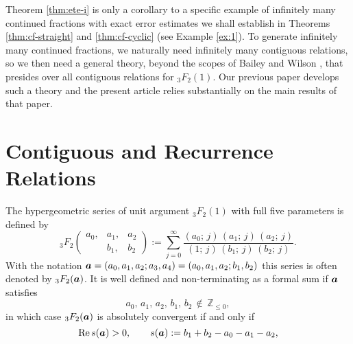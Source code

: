 \documentclass[a4paper,12pt]{article}
\theoremstyle{plain}
\def\rRe{\mathrm{Re}}
\def\Z{\mathbb{Z}}
\def\ba{\mbox{\boldmath $a$}}
\begin{document}
\par
Theorem \ref{thm:ete-i} is only a corollary to a specific example of  
infinitely many continued fractions with exact error 
estimates we shall establish in 
Theorems \ref{thm:cf-straight} and \ref{thm:cf-cyclic} (see Example \ref{ex:1}).  
To generate infinitely many continued fractions, we naturally need infinitely many 
contiguous relations, so we then need a general theory, beyond the scopes of 
Bailey \cite{Bailey2} and Wilson \cite{Wilson}, that presides over all contiguous 
relations for ${}_3F_2(1)$.  
Our previous paper \cite{EI} develops such a theory and the present article relies 
substantially on the main results of that paper.          
\section{Contiguous and Recurrence Relations} \label{sec:contig}
The hypergeometric series of unit argument ${}_3F_2(1)$ with full five 
parameters is defined by 
\begin{equation*} 
{}_3F_2\! 
\begin{pmatrix} 
a_0, & a_1, & a_2 \\ 
     & b_1, & b_2    
\end{pmatrix} := \sum_{j=0}^{\infty} 
\dfrac{(a_0; \, j) \, (a_1; \, j) \, (a_2; \, j)}{(1; \, j) \, 
(b_1; \, j) \, (b_2; \, j)}.    
\end{equation*}
With the notation $\ba = (a_0, a_1, a_2; a_3, a_4) = (a_0, a_1, a_2; b_1, b_2)$ 
this series is often denoted by ${}_3F_2(\ba)$. 
It is well defined and non-terminating as a formal sum if $\ba$ satisfies  
\begin{equation} \label{eqn:WD} 
a_0, \, a_1, \, a_2, \, b_1, \, b_2 \, \not\in \, \Z_{\le 0},        
\end{equation}
in which case ${}_3F_2(\ba)$ is absolutely convergent if and only if 
\begin{equation} \label{eqn:3saal2}
\rRe \, s(\ba)  > 0, \qquad s(\ba) := b_1+b_2-a_0-a_1-a_2,   
\end{equation}
\end{document}
